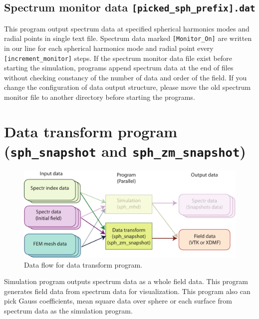 \subsection{Spectrum monitor data {\tt [picked\_sph\_prefix].dat}}
This program output spectrum data at specified spherical harmonics modes and radial points in single text file. Spectrum data marked \verb|[Monitor_On]| are written in our line for each spherical harmonics mode and radial point every \verb|[increment_monitor]| steps. If the spectrum monitor data file exist before starting the simulation, programs append spectrum data at the end of files without checking constancy of the number of data and order of the field. If you change the configuration of data output structure, please move the old spectrum monitor file to another directory before starting the programs.


\newpage
\section{Data transform program ({\tt sph\_snapshot} and {\tt sph\_zm\_snapshot})}
\label{section:assemble_sph}
%
\begin{figure}[htbp]
\begin{center}
\includegraphics*[width=130mm]{images/flow_3}
\end{center}
\caption{Data flow for data transform program.}
\label{fig:flow_3}
\end{figure}
%
Simulation program outputs spectrum data as a whole field data. This program generates field data from spectrum data for visualization. This program also can pick Gauss coefficients, mean square data over sphere or each surface from spectrum data as the simulation program.

